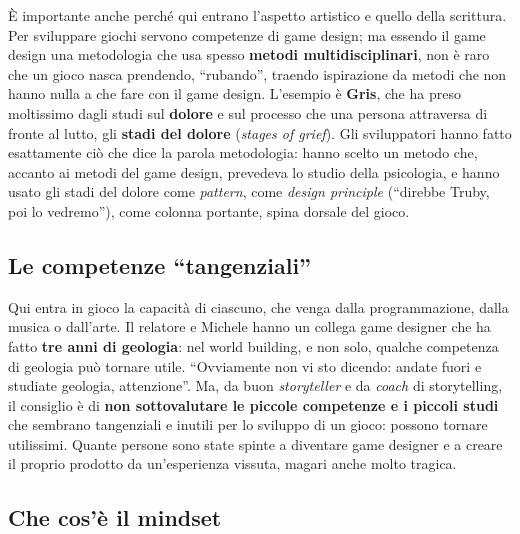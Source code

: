È importante anche perché qui entrano l'aspetto artistico e quello della
scrittura. Per sviluppare giochi servono competenze di game design; ma
essendo il game design una metodologia che usa spesso \textbf{metodi
multidisciplinari}, non è raro che un gioco nasca prendendo, ``rubando'',
traendo ispirazione da metodi che non hanno nulla a che fare con il game
design. L'esempio è \textbf{Gris}, che ha preso moltissimo dagli studi sul
\textbf{dolore} e sul processo che una persona attraversa di fronte al lutto,
gli \textbf{stadi del dolore} (\emph{stages of grief}). Gli sviluppatori hanno
fatto esattamente ciò che dice la parola metodologia: hanno scelto un metodo
che, accanto ai metodi del game design, prevedeva lo studio della psicologia,
e hanno usato gli stadi del dolore come \emph{pattern}, come \emph{design
principle} (``direbbe Truby, poi lo vedremo''), come colonna portante, spina
dorsale del gioco.

\subsection{Le competenze ``tangenziali''}

Qui entra in gioco la capacità di ciascuno, che venga dalla programmazione,
dalla musica o dall'arte. Il relatore e Michele hanno un collega game designer
che ha fatto \textbf{tre anni di geologia}: nel world building, e non solo,
qualche competenza di geologia può tornare utile. ``Ovviamente non vi sto
dicendo: andate fuori e studiate geologia, attenzione''. Ma, da buon
\emph{storyteller} e da \emph{coach} di storytelling, il consiglio è di
\textbf{non sottovalutare le piccole competenze e i piccoli studi} che sembrano
tangenziali e inutili per lo sviluppo di un gioco: possono tornare utilissimi.
Quante persone sono state spinte a diventare game designer e a creare il
proprio prodotto da un'esperienza vissuta, magari anche molto tragica.

\subsection{Che cos'è il mindset}
\label{subsec:z6-mindset}


